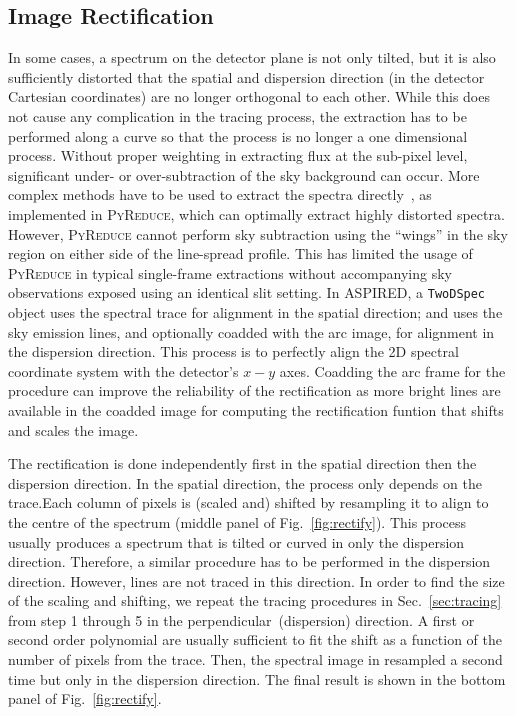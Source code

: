 \documentclass[linenumbers, twocolumn]{aastex631}
\begin{document}
\subsection{Image Rectification}
In some cases, a spectrum on the detector plane is not only tilted, but it is
also sufficiently distorted that the spatial and dispersion direction (in the
detector Cartesian coordinates) are no longer orthogonal to each other. While
this does not cause any complication in the tracing process, the extraction has
to be performed along a curve so that the process is no longer a one dimensional
process. Without proper weighting in extracting flux at the sub-pixel level,
significant under- or over-subtraction of the sky background can occur. More
complex methods have to be used to extract the spectra
directly~\citep[e.g.][]{2021A&A...646A..32P}, as implemented in
\textsc{PyReduce}, which can optimally extract highly distorted spectra.
However, \textsc{PyReduce} cannot perform sky subtraction using the ``wings''
in the sky region on either side of the line-spread profile. This has limited
the usage of \textsc{PyReduce} in typical single-frame extractions without
accompanying sky observations exposed using an identical slit setting. In
\textsc{ASPIRED}, a \texttt{TwoDSpec} object uses the spectral trace for
alignment in the spatial direction; and uses the sky emission lines, and
optionally coadded with the arc image, for alignment in the dispersion
direction. This process is to perfectly align the 2D spectral coordinate system
with the detector's $x-y$ axes. Coadding the arc frame for the procedure can
improve the reliability of the rectification as more bright lines are available
in the coadded image for computing the rectification funtion that shifts and
scales the image.

The rectification is done independently first in the spatial direction then
the dispersion direction. In the spatial direction, the process only depends
on the trace.Each column of pixels is (scaled and) shifted by resampling it to
align to the centre of the spectrum (middle panel of Fig.~\ref{fig:rectify}).
This process usually produces a spectrum that is tilted or curved in only the
dispersion direction. Therefore, a similar procedure has to be performed in
the dispersion direction. However, lines are not traced in this direction. In
order to find the size of the scaling and shifting, we repeat the tracing
procedures in Sec.~\ref{sec:tracing} from step 1 through 5 in the
perpendicular~(dispersion) direction. A first or second order polynomial are
usually sufficient to fit the shift as a function of the number of pixels from
the trace. Then, the spectral image in resampled a second time but only in the
dispersion direction. The final result is shown in the bottom panel of
Fig.~\ref{fig:rectify}.
\end{document}
